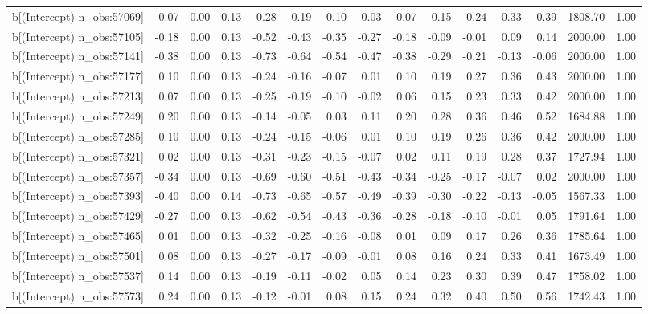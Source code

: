 \begin{table}[ht]
\begin{tabular}{rrrrrrrrrrrrrrr}
  b[(Intercept) n\_obs:57069] & 0.07 & 0.00 & 0.13 & -0.28 & -0.19 & -0.10 & -0.03 & 0.07 & 0.15 & 0.24 & 0.33 & 0.39 & 1808.70 & 1.00 \\ 
  b[(Intercept) n\_obs:57105] & -0.18 & 0.00 & 0.13 & -0.52 & -0.43 & -0.35 & -0.27 & -0.18 & -0.09 & -0.01 & 0.09 & 0.14 & 2000.00 & 1.00 \\ 
  b[(Intercept) n\_obs:57141] & -0.38 & 0.00 & 0.13 & -0.73 & -0.64 & -0.54 & -0.47 & -0.38 & -0.29 & -0.21 & -0.13 & -0.06 & 2000.00 & 1.00 \\ 
  b[(Intercept) n\_obs:57177] & 0.10 & 0.00 & 0.13 & -0.24 & -0.16 & -0.07 & 0.01 & 0.10 & 0.19 & 0.27 & 0.36 & 0.43 & 2000.00 & 1.00 \\ 
  b[(Intercept) n\_obs:57213] & 0.07 & 0.00 & 0.13 & -0.25 & -0.19 & -0.10 & -0.02 & 0.06 & 0.15 & 0.23 & 0.33 & 0.42 & 2000.00 & 1.00 \\ 
  b[(Intercept) n\_obs:57249] & 0.20 & 0.00 & 0.13 & -0.14 & -0.05 & 0.03 & 0.11 & 0.20 & 0.28 & 0.36 & 0.46 & 0.52 & 1684.88 & 1.00 \\ 
  b[(Intercept) n\_obs:57285] & 0.10 & 0.00 & 0.13 & -0.24 & -0.15 & -0.06 & 0.01 & 0.10 & 0.19 & 0.26 & 0.36 & 0.42 & 2000.00 & 1.00 \\ 
  b[(Intercept) n\_obs:57321] & 0.02 & 0.00 & 0.13 & -0.31 & -0.23 & -0.15 & -0.07 & 0.02 & 0.11 & 0.19 & 0.28 & 0.37 & 1727.94 & 1.00 \\ 
  b[(Intercept) n\_obs:57357] & -0.34 & 0.00 & 0.13 & -0.69 & -0.60 & -0.51 & -0.43 & -0.34 & -0.25 & -0.17 & -0.07 & 0.02 & 2000.00 & 1.00 \\ 
  b[(Intercept) n\_obs:57393] & -0.40 & 0.00 & 0.14 & -0.73 & -0.65 & -0.57 & -0.49 & -0.39 & -0.30 & -0.22 & -0.13 & -0.05 & 1567.33 & 1.00 \\ 
  b[(Intercept) n\_obs:57429] & -0.27 & 0.00 & 0.13 & -0.62 & -0.54 & -0.43 & -0.36 & -0.28 & -0.18 & -0.10 & -0.01 & 0.05 & 1791.64 & 1.00 \\ 
  b[(Intercept) n\_obs:57465] & 0.01 & 0.00 & 0.13 & -0.32 & -0.25 & -0.16 & -0.08 & 0.01 & 0.09 & 0.17 & 0.26 & 0.36 & 1785.64 & 1.00 \\ 
  b[(Intercept) n\_obs:57501] & 0.08 & 0.00 & 0.13 & -0.27 & -0.17 & -0.09 & -0.01 & 0.08 & 0.16 & 0.24 & 0.33 & 0.41 & 1673.49 & 1.00 \\ 
  b[(Intercept) n\_obs:57537] & 0.14 & 0.00 & 0.13 & -0.19 & -0.11 & -0.02 & 0.05 & 0.14 & 0.23 & 0.30 & 0.39 & 0.47 & 1758.02 & 1.00 \\ 
  b[(Intercept) n\_obs:57573] & 0.24 & 0.00 & 0.13 & -0.12 & -0.01 & 0.08 & 0.15 & 0.24 & 0.32 & 0.40 & 0.50 & 0.56 & 1742.43 & 1.00 \\ 

\end{tabular}
\end{table}
